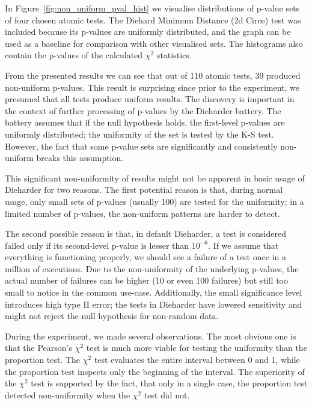 \documentclass[
	digital,    %
	oneside,    %
	color,
	11pt,
	nocover,
	notable,
	nolof,
	nolot,
]{fithesis3}
\theoremstyle{definition}
\theoremstyle{remark}
\begin{document}
In Figure~\ref{fig:non_uniform_pval_hist} we visualise distributions of p-value sets of four chosen atomic tests. The Diehard Minimum Distance (2d Circe) test was included because its p-values are uniformly distributed, and the graph can be used as a baseline for comparison with other visualised sets. The histograms also contain the p-values of the calculated $\chi^2$ statistics.

From the presented results we can see that out of 110 atomic tests, 39 produced non-uniform p-values. This result is surprising since prior to the experiment, we presumed that all tests produce uniform results. The discovery is important in the context of further processing of p-values by the Dieharder battery. The battery assumes that if the null hypothesis holds, the first-level p-values are uniformly distributed; the uniformity of the set is tested by the K-S test. However, the fact that some p-value sets are significantly and consistently non-uniform breaks this assumption.

This significant non-uniformity of results might not be apparent in basic usage of Dieharder for two reasons. The first potential reason is that, during normal usage, only small sets of p-values (usually 100) are tested for the uniformity; in a limited number of p-values, the non-uniform patterns are harder to detect. 

The second possible reason is that, in default Dieharder, a test is considered failed only if its second-level p-value is lesser than $10^{-6}$. If we assume that everything is functioning properly, we should see a failure of a test once in a million of executions. Due to the non-uniformity of the underlying p-values, the actual number of failures can be higher (10 or even 100 failures) but still too small to notice in the common use-case. Additionally, the small significance level introduces high type II error; the tests in Dieharder have lowered sensitivity and might not reject the null hypothesis for non-random data.

During the experiment, we made several observations. The most obvious one is that the Pearson's $\chi^2$ test is much more viable for testing the uniformity than the proportion test. The $\chi^2$ test evaluates the entire interval between 0 and 1, while the proportion test inspects only the beginning of the interval. The superiority of the $\chi^2$ test is supported by the fact, that only in a single case, the proportion test detected non-uniformity when the $\chi^2$ test did not. 
\end{document}
